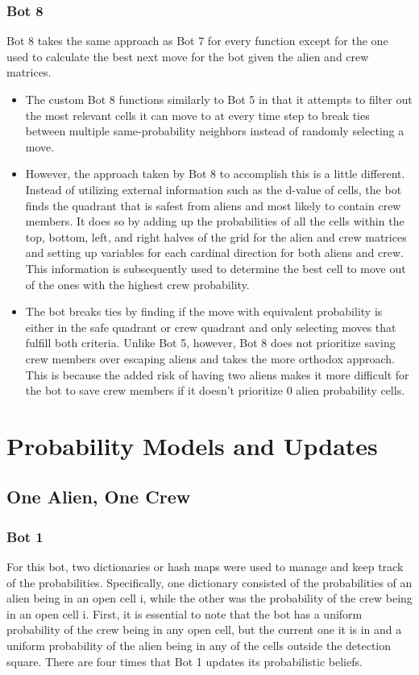 \documentclass[11pt]{article}
\begin{document}
\subsubsection{Bot 8}

Bot 8 takes the same approach as Bot 7 for every function except for the one used to calculate the best next move for the bot given the alien and crew matrices.

\begin{itemize}
    \item The custom Bot 8 functions similarly to Bot 5 in that it attempts to filter out the most relevant cells it can move to at every time step to break ties between multiple same-probability neighbors instead of randomly selecting a move.
    \item However, the approach taken by Bot 8 to accomplish this is a little different. Instead of utilizing external information such as the d-value of cells, the bot finds the quadrant that is safest from aliens and most likely to contain crew members. It does so by adding up the probabilities of all the cells within the top, bottom, left, and right halves of the grid for the alien and crew matrices and setting up variables for each cardinal direction for both aliens and crew. This information is subsequently used to determine the best cell to move out of the ones with the highest crew probability.
    \item The bot breaks ties by finding if the move with equivalent probability is either in the safe quadrant or crew quadrant and only selecting moves that fulfill both criteria. Unlike Bot 5, however, Bot 8 does not prioritize saving crew members over escaping aliens and takes the more orthodox approach. This is because the added risk of having two aliens makes it more difficult for the bot to save crew members if it doesn't prioritize 0 alien probability cells.
\end{itemize}

\section{Probability Models and Updates}

\subsection{One Alien, One Crew}

\subsubsection{Bot 1}
For this bot, two dictionaries or hash maps were used to manage and keep track of the probabilities. Specifically, one dictionary consisted of the probabilities of an alien being in an open cell i, while the other was the probability of the crew being in an open cell i. First, it is essential to note that the bot has a uniform probability of the crew being in any open cell, but the current one it is in and a uniform probability of the alien being in any of the cells outside the detection square. There are four times that Bot 1 updates its probabilistic beliefs.
\medskip
\end{document}
